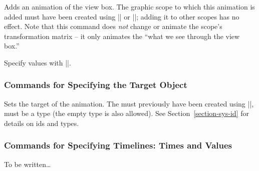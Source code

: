 \begin{command}{\pgfsys@animateviewbox}
  Adds an animation of the view box. The graphic scope to which this
  animation is added must have been created using
  |\pgfsys@viewboxmeet| or |\pgfsys@viewboxslice|; adding it to other
  scopes has no effect. Note that this command does \emph{not}
  change or animate the scope's transformation matrix -- it only animates the
  ``what we see through the view box.''
  
  Specify values with |\pgfsys@animation@viewbox|.
\begin{codeexample}[width=5cm]
\end{codeexample}
\end{command}


\subsubsection{Commands for Specifying the Target Object}

\begin{command}{\pgfsys@animation@whom{}}
  Sets the target of the animation. The  must previously have
  been created using |\pgfsys@new@id|,  must be a type (the
  empty type is also allowed). See Section~\ref{section-sys-id} for
  details on ids and types.
\end{command}


\subsubsection{Commands for Specifying Timelines: Times and Values}

\begin{command}{\pgfsys@animation@time{}}
  To be written\dots
\end{command}


